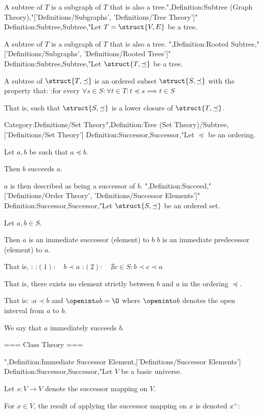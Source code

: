 A subtree of $T$ is a subgraph of $T$ that is also a tree.",Definition:Subtree (Graph Theory),"['Definitions/Subgraphs', 'Definitions/Tree Theory']"
Definition:Subtree,Subtree,"Let $T = \struct {V, E}$ be a tree.


A subtree of $T$ is a subgraph of $T$ that is also a tree.
",Definition:Rooted Subtree,"['Definitions/Subgraphs', 'Definitions/Rooted Trees']"
Definition:Subtree,Subtree,"Let $\struct {T, \preceq}$ be a tree.

A subtree of $\struct {T, \preceq}$ is an ordered subset $\struct {S, \preceq}$ with the property that:
:for every $\forall s \in S: \forall t \in T: t \preceq s \implies t \in S$

That is, such that $\struct {S, \preceq}$ is a lower closure of $\struct {T, \preceq}$.


Category:Definitions/Set Theory",Definition:Tree (Set Theory)/Subtree,['Definitions/Set Theory']
Definition:Successor,Successor,"Let $\preceq$ be an ordering.

Let $a, b$ be such that $a \preceq b$.


Then $b$ succeeds $a$.

$a$ is then described as being a successor of $b$.
",Definition:Succeed,"['Definitions/Order Theory', 'Definitions/Successor Elements']"
Definition:Successor,Successor,"Let $\struct {S, \preceq}$ be an ordered set.

Let $a, b \in S$.


Then $a$ is an immediate successor (element) to $b$  $b$ is an immediate predecessor (element) to $a$.

That is, :
:$(1): \quad b \prec a$
:$(2): \quad \nexists c \in S: b \prec c \prec a$

That is, there exists no element strictly between $b$ and $a$ in the ordering $\preceq$.

That is:
:$a \prec b$ and $\openint a b = \O$
where $\openint a b$ denotes the open interval from $a$ to $b$.


We say that $a$ immediately succeeds $b$.


=== Class Theory ===

",Definition:Immediate Successor Element,['Definitions/Successor Elements']
Definition:Successor,Successor,"Let $V$ be a basic universe.

Let $s: V \to V$ denote the successor mapping on $V$.


For $x \in V$, the result of applying the successor mapping on $x$ is denoted $x^+$:


